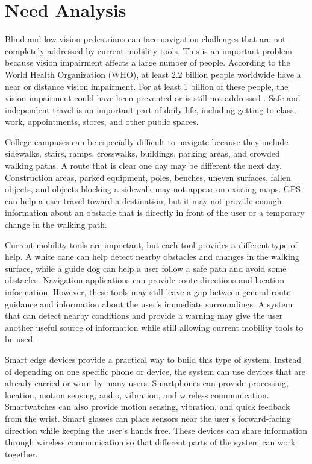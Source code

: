 \documentclass[12pt,letterpaper,oneside,reqno]{book}
\theoremstyle{plain}
\theoremstyle{definition}
\theoremstyle{plain}
\theoremstyle{remark}
\theoremstyle{plain}
\theoremstyle{definition}
\theoremstyle{plain}
\begin{document}
\section{Need Analysis}
Blind and low-vision pedestrians can face navigation challenges that are not completely addressed by current mobility tools. This is an important problem because vision impairment affects a large number of people. According to the World Health Organization (WHO), at least 2.2 billion people worldwide have a near or distance vision impairment. For at least 1 billion of these people, the vision impairment could have been prevented or is still not addressed \cite{WHO2026}. Safe and independent travel is an important part of daily life, including getting to class, work, appointments, stores, and other public spaces.

College campuses can be especially difficult to navigate because they include sidewalks, stairs, ramps, crosswalks, buildings, parking areas, and crowded walking paths. A route that is clear one day may be different the next day. Construction areas, parked equipment, poles, benches, uneven surfaces, fallen objects, and objects blocking a sidewalk may not appear on existing maps. GPS can help a user travel toward a destination, but it may not provide enough information about an obstacle that is directly in front of the user or a temporary change in the walking path.

Current mobility tools are important, but each tool provides a different type of help. A white cane can help detect nearby obstacles and changes in the walking surface, while a guide dog can help a user follow a safe path and avoid some obstacles. Navigation applications can provide route directions and location information. However, these tools may still leave a gap between general route guidance and information about the user's immediate surroundings. A system that can detect nearby conditions and provide a warning may give the user another useful source of information while still allowing current mobility tools to be used.

Smart edge devices provide a practical way to build this type of system. Instead of depending on one specific phone or device, the system can use devices that are already carried or worn by many users. Smartphones can provide processing, location, motion sensing, audio, vibration, and wireless communication. Smartwatches can also provide motion sensing, vibration, and quick feedback from the wrist. Smart glasses can place sensors near the user's forward-facing direction while keeping the user's hands free. These devices can share information through wireless communication so that different parts of the system can work together.
\end{document}
